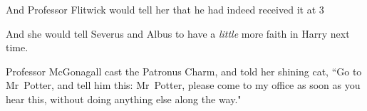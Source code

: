 And Professor Flitwick would tell her that he had indeed received it at 3\pm

And she would tell Severus and Albus to have a \emph{little} more faith in Harry next time.

Professor McGonagall cast the Patronus Charm, and told her shining cat, ``Go to Mr~Potter, and tell him this: Mr~Potter, please come to my office as soon as you hear this, without doing anything else along the way."

